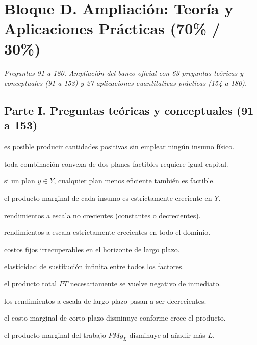 \section*{Bloque D. Ampliación: Teoría y Aplicaciones Prácticas (70\% / 30\%)}

\noindent\textit{Preguntas 91 a 180. Ampliación del banco oficial con 63 preguntas teóricas y conceptuales (91 a 153) y 27 aplicaciones cuantitativas prácticas (154 a 180).}

\subsection*{Parte I. Preguntas teóricas y conceptuales (91 a 153)}

\begin{opts}
    \item es posible producir cantidades positivas sin emplear ningún insumo físico.
    \item toda combinación convexa de dos planes factibles requiere igual capital.
    \item si un plan $y \in Y$, cualquier plan menos eficiente también es factible.
    \item el producto marginal de cada insumo es estrictamente creciente en $Y$.
\end{opts}

\begin{opts}
    \item rendimientos a escala no crecientes (constantes o decrecientes).
    \item rendimientos a escala estrictamente crecientes en todo el dominio.
    \item costos fijos irrecuperables en el horizonte de largo plazo.
    \item elasticidad de sustitución infinita entre todos los factores.
\end{opts}

\begin{opts}
    \item el producto total $PT$ necesariamente se vuelve negativo de inmediato.
    \item los rendimientos a escala de largo plazo pasan a ser decrecientes.
    \item el costo marginal de corto plazo disminuye conforme crece el producto.
    \item el producto marginal del trabajo $PMg_L$ disminuye al añadir más $L$.
\end{opts}

